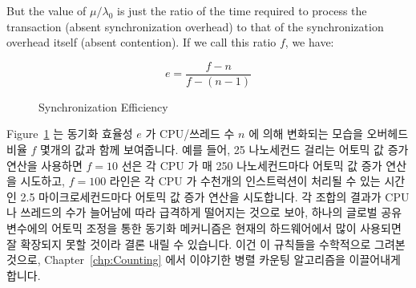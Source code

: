 But the value of $\mu / \lambda_0$ is just the ratio of the time required
to process the transaction (absent synchronization overhead) to that of 
the synchronization overhead itself (absent contention).
If we call this ratio $f$, we have:
\fi

\begin{equation}
	e = \frac{f - n}{f - (n - 1)}
\end{equation}

\begin{figure}[tbp]
\centering
{}
\caption{Synchronization Efficiency}
\label{fig:SMPdesign:Synchronization Efficiency}
\end{figure}

Figure~\ref{fig:SMPdesign:Synchronization Efficiency} 는 동기화 효율성 $e$ 가
CPU/쓰레드 수 $n$ 에 의해 변화되는 모습을 오버헤드 비율 $f$ 몇개의 값과 함께
보여줍니다.
예를 들어, 25 나노세컨드 걸리는 어토믹 값 증가 연산을 사용하면 $f=10$ 선은 각
CPU 가 매 250 나노세컨드마다 어토믹 값 증가 연산을 시도하고, $f=100$ 라인은 각
CPU 가 수천개의 인스트럭션이 처리될 수 있는 시간인 2.5 마이크로세컨드마다
어토믹 값 증가 연산을 시도합니다.
각 조합의 결과가 CPU 나 쓰레드의 수가 늘어남에 따라 급격하게 떨어지는 것으로
보아, 하나의 글로벌 공유 변수에의 어토믹 조정을 통한 동기화 메커니즘은 현재의
하드웨어에서 많이 사용되면 잘 확장되지 못할 것이라 결론 내릴 수 있습니다.
이건 이 규칙들을 수학적으로 그려본 것으로, Chapter~\ref{chp:Counting} 에서
이야기한 병렬 카운팅 알고리즘을 이끌어내게 합니다.
\iffalse


